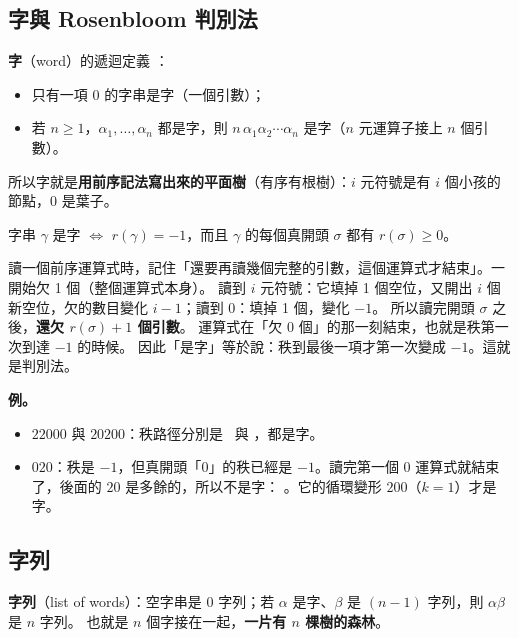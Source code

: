 \subsection{字與 Rosenbloom 判別法}

\textbf{字}（word）的遞迴定義 ：
\begin{itemize}
  \item 只有一項 $0$ 的字串是字（一個引數）；
  \item 若 $n\ge1$，$\alpha_1,\ldots,\alpha_n$ 都是字，則 $n\,\alpha_1\alpha_2\cdots\alpha_n$ 是字（$n$ 元運算子接上 $n$ 個引數）。
\end{itemize}
所以字就是\textbf{用前序記法寫出來的平面樹}（有序有根樹）：$i$ 元符號是有 $i$ 個小孩的節點，0 是葉子。

\begin{thmbox}
字串 $\gamma$ 是字 $\iff$ $r(\gamma)=-1$，而且 $\gamma$ 的每個真開頭 $\sigma$ 都有 $r(\sigma)\ge0$。
\end{thmbox}

\begin{notebox}
讀一個前序運算式時，記住「還要再讀幾個完整的引數，這個運算式才結束」。一開始欠 1 個（整個運算式本身）。
讀到 $i$ 元符號：它填掉 1 個空位，又開出 $i$ 個新空位，欠的數目變化 $i-1$；讀到 0：填掉 1 個，變化 $-1$。
所以讀完開頭 $\sigma$ 之後，\textbf{還欠 $r(\sigma)+1$ 個引數}。
運算式在「欠 0 個」的那一刻結束，也就是秩第一次到達 $-1$ 的時候。
因此「是字」等於說：秩到最後一項才第一次變成 $-1$。這就是判別法。
\end{notebox}

\textbf{例。}
\begin{itemize}
  \item $22000$ 與 $20200$：秩路徑分別是 \RanWalkPlusOne\ 與 \RanWalkPlusTwo，都是字。
  \item $020$：秩是 $-1$，但真開頭「$0$」的秩已經是 $-1$。讀完第一個 0 運算式就結束了，後面的 $20$ 是多餘的，所以不是字：
        \RanNotWord。它的循環變形 $200$（$k=1$）才是字。
\end{itemize}

\subsection{字列}

\textbf{字列}（list of words）：空字串是 0 字列；若 $\alpha$ 是字、$\beta$ 是 $(n-1)$ 字列，則 $\alpha\beta$ 是 $n$ 字列。
也就是 $n$ 個字接在一起，\textbf{一片有 $n$ 棵樹的森林}。

